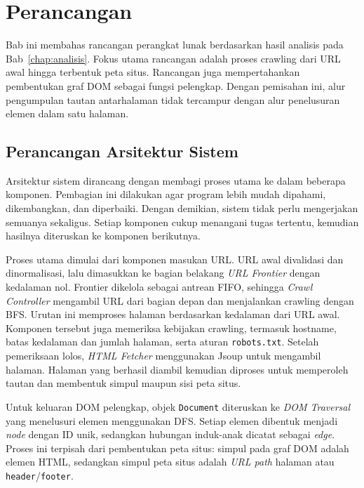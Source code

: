 \chapter{Perancangan}
\label{chap:perancangan}

Bab ini membahas rancangan perangkat lunak berdasarkan hasil analisis pada Bab~\ref{chap:analisis}. Fokus utama rancangan adalah proses crawling dari URL awal hingga terbentuk peta situs. Rancangan juga mempertahankan pembentukan graf DOM sebagai fungsi pelengkap. Dengan pemisahan ini, alur pengumpulan tautan antarhalaman tidak tercampur dengan alur penelusuran elemen dalam satu halaman.

\section{Perancangan Arsitektur Sistem}
\label{sec:perancangan-arsitektur-sistem}

Arsitektur sistem dirancang dengan membagi proses utama ke dalam beberapa komponen. Pembagian ini dilakukan agar program lebih mudah dipahami, dikembangkan, dan diperbaiki. Dengan demikian, sistem tidak perlu mengerjakan semuanya sekaligus. Setiap komponen cukup menangani tugas tertentu, kemudian hasilnya diteruskan ke komponen berikutnya.

Proses utama dimulai dari komponen masukan URL. URL awal divalidasi dan dinormalisasi, lalu dimasukkan ke bagian belakang \textit{URL Frontier} dengan kedalaman nol. Frontier dikelola sebagai antrean FIFO, sehingga \textit{Crawl Controller} mengambil URL dari bagian depan dan menjalankan crawling dengan BFS. Urutan ini memproses halaman berdasarkan kedalaman dari URL awal. Komponen tersebut juga memeriksa kebijakan crawling, termasuk hostname, batas kedalaman dan jumlah halaman, serta aturan \texttt{robots.txt}. Setelah pemeriksaan lolos, \textit{HTML Fetcher} menggunakan Jsoup untuk mengambil halaman. Halaman yang berhasil diambil kemudian diproses untuk memperoleh tautan dan membentuk simpul maupun sisi peta situs.

Untuk keluaran DOM pelengkap, objek \texttt{Document} diteruskan ke \textit{DOM Traversal} yang menelusuri elemen menggunakan DFS. Setiap elemen dibentuk menjadi \textit{node} dengan ID unik, sedangkan hubungan induk-anak dicatat sebagai \textit{edge}. Proses ini terpisah dari pembentukan peta situs: simpul pada graf DOM adalah elemen HTML, sedangkan simpul peta situs adalah \textit{URL path} halaman atau \texttt{header}/\texttt{footer}.

